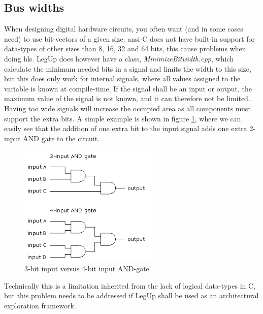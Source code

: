 \subsection{Bus widths}
When designing digital hardware circuits, you often want (and in some cases need) to use bit-vectors of a given size. \gls{ansi}-C does not have built-in support for data-types of other sizes than 8, 16, 32 and 64 bits, this cause problems when doing \gls{hls}. LegUp does however have a class, \textit{MinimizeBitwidth.cpp}, which calculate the minimum needed bits in a signal and limits the width to this size, but this does only work for internal signals, where all values assigned to the variable is known at compile-time. If the signal shall be an input or output, the maximum value of the signal is not known, and it can therefore not be limited. Having too wide signals will increase the occupied area as all components must support the extra bits. A simple example is shown in figure \ref{fig:andgate34}, where we can easily see that the addition of one extra bit to the input signal adds one extra 2-input AND gate to the circuit.
\begin{figure}[hbpt]
\centering
\includegraphics[width=0.6\textwidth]{../figs/AndGate34Bit.png}
\caption{\label{fig:andgate34}3-bit input versus 4-bit input AND-gate}
\end{figure}
Technically this is a limitation inherited from the lack of logical data-types in C, but this problem needs to be addressed if LegUp shall be used as an architectural exploration framework.
